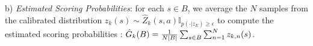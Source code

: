 \documentclass{article}
\newcommand{\condition}{z_{E}}
\newcommand{\state}{s}
\newcommand{\action}{a}
\newcommand{\agentIndex}{k}
\newcommand{\bin}{B}
\newcommand{\goal}{g}
\begin{document}
b){ \it Estimated Scoring Probabilities}: for each $\state\in\bin$, we average the $N$ samples from the calibrated distribution $z_{\agentIndex}(\state)\sim\hat{Z}_{\agentIndex}(\state,\action)\mathbb{I}_{p(\cdot|\condition)\geq\epsilon}$ to compute the estimated scoring probabilities : $\hat{\MakeUppercase{\goal}}_{\agentIndex}(\bin) = \frac{1}{N|\bin|}\sum_{\state \in \bin} \sum_{n=1}^{N}z_{\agentIndex,n}(\state)$.



\end{document}
